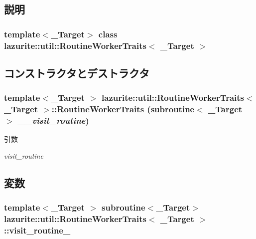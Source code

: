 \subsection{説明}
\subsubsection*{template$<$\_\-Target$>$ class lazurite::util::RoutineWorkerTraits$<$ \_\-Target $>$}



\subsection{コンストラクタとデストラクタ}
\hypertarget{classlazurite_1_1util_1_1_routine_worker_traits_3_01___target_01_4_ae1c3b92591b64d791b7a2881153cbad4}{
\subsubsection[{RoutineWorkerTraits}]{\setlength{\rightskip}{0pt plus 5cm}template$<$\_\-Target $>$ lazurite::util::RoutineWorkerTraits$<$ \_\-Target $>$::RoutineWorkerTraits (subroutine$<$ \_\-Target $>$ {\em \_\-\_\-visit\_\-routine})}}
\label{classlazurite_1_1util_1_1_routine_worker_traits_3_01___target_01_4_ae1c3b92591b64d791b7a2881153cbad4}

\begin{DoxyParams}{引数}
\item[{\em visit\_\-routine}]\end{DoxyParams}


\subsection{変数}
\hypertarget{classlazurite_1_1util_1_1_routine_worker_traits_3_01___target_01_4_ab9bab0223933a95d8a08f8013beb8312}{
\subsubsection[{visit\_\-routine\_\-}]{\setlength{\rightskip}{0pt plus 5cm}template$<$\_\-Target $>$ subroutine$<$\_\-Target$>$ lazurite::util::RoutineWorkerTraits$<$ \_\-Target $>$::{\bf visit\_\-routine\_\-}}}
\label{classlazurite_1_1util_1_1_routine_worker_traits_3_01___target_01_4_ab9bab0223933a95d8a08f8013beb8312}


